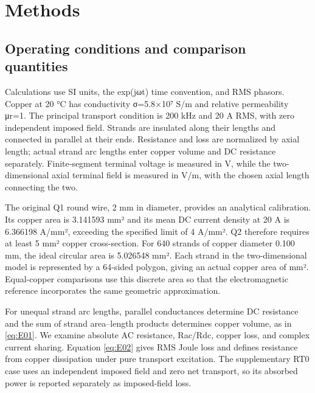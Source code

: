 \section{Methods}
\label{chapter:02}

\hypertarget{02.conventions.heading}{}
\subsection{Operating conditions and comparison quantities}

\hypertarget{02.conventions.p1}{}
Calculations use SI units, the exp(jωt) time convention, and RMS phasors. Copper at 20 °C has conductivity σ=5.8×10⁷ S/m and relative permeability μr=1. The principal transport condition is 200 kHz and 20 A RMS, with zero independent imposed field. Strands are insulated along their lengths and connected in parallel at their ends. Resistance and loss are normalized by axial length; actual strand arc lengths enter copper volume and DC resistance separately. Finite-segment terminal voltage is measured in V, while the two-dimensional axial terminal field is measured in V/m, with the chosen axial length connecting the two.

\hypertarget{02.conventions.p2}{}
The original Q1 round wire, 2 mm in diameter, provides an analytical calibration. Its copper area is 3.141593 mm² and its mean DC current density at 20 A is 6.366198 A/mm², exceeding the specified limit of 4 A/mm². Q2 therefore requires at least 5 mm² copper cross-section. For 640 strands of copper diameter 0.100 mm, the ideal circular area is 5.026548 mm². Each strand in the two-dimensional model is represented by a 64-sided polygon, giving an actual copper area of  mm². Equal-copper comparisons use this discrete area so that the electromagnetic reference incorporates the same geometric approximation.

\hypertarget{02.conventions.p3}{}
For unequal strand arc lengths, parallel conductances determine DC resistance and the sum of strand area–length products determines copper volume, as in \eqref{eq:E01}. We examine absolute AC resistance, Rac/Rdc, copper loss, and complex current sharing. Equation \eqref{eq:E02} gives RMS Joule loss and defines resistance from copper dissipation under pure transport excitation. The supplementary RT0 case uses an independent imposed field and zero net transport, so its absorbed power is reported separately as imposed-field loss.

